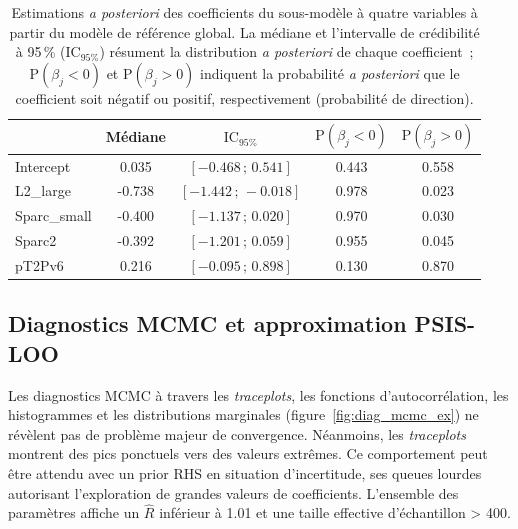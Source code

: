 \begin{table}[ht]
	\centering
	\begin{tabular}{lcccc}
		\hline
		& Médiane & $\text{IC}_{95\%}$ & $\text{P}(\beta_j < 0)$ & $\text{P}(\beta_j > 0)$ \\
		\hline
		Intercept      &  0.035 & $[-0.468 \,;\, 0.541]$ & 0.443 & 0.558 \\
		L2\_large      & -0.738 & $[-1.442 \,;\, -0.018]$ & 0.978 & 0.023 \\
		Sparc\_small   & -0.400 & $[-1.137 \,;\, 0.020]$ & 0.970 & 0.030 \\
		Sparc2         & -0.392 & $[-1.201 \,;\, 0.059]$ & 0.955 & 0.045 \\
		pT2Pv6         &  0.216 & $[-0.095 \,;\, 0.898]$ & 0.130 & 0.870 \\
		\hline
	\end{tabular}
	\caption[Estimations \textit{a posteriori} du sous-modèle réduit à partir du modèle de référence global]{Estimations \textit{a posteriori} des coefficients du sous-modèle à quatre variables à partir du modèle de référence global. La médiane et l'intervalle de crédibilité à 95\,\% (IC$_{95\%}$) résument la distribution \textit{a posteriori} de chaque coefficient~; $\text{P}(\beta_j < 0)$ et $\text{P}(\beta_j > 0)$ indiquent la probabilité \textit{a posteriori} que le coefficient soit négatif ou positif, respectivement (probabilité de direction).}
	\label{table:inf_full}
\end{table}



\subsection{Diagnostics MCMC et approximation PSIS-LOO}
Les diagnostics MCMC à travers les \textit{traceplots}, les fonctions d'autocorrélation, les histogrammes et les distributions marginales (figure~\ref{fig:diag_mcmc_ex}) ne révèlent pas de problème majeur de convergence. Néanmoins, les \textit{traceplots} montrent des pics ponctuels vers des valeurs extrêmes. Ce comportement peut être attendu avec un prior RHS en situation d'incertitude, ses queues lourdes autorisant l'exploration de grandes valeurs de coefficients. L'ensemble des paramètres affiche un $\hat{R}$ inférieur à 1.01 et une taille effective d'échantillon > 400.

